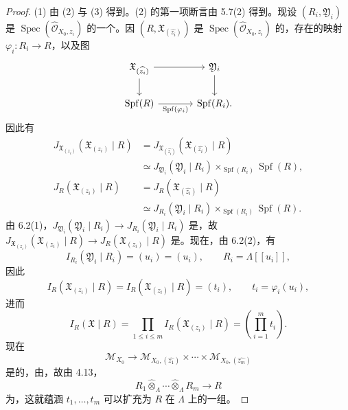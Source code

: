 \begin{proof}
(1) 由 (2) 与 (3) 得到。(2) 的第一项断言由 5.7(2) 得到。现设 $(R_i,\mathfrak Y_i)$ 是 $\operatorname{Spec}(\widehat{\mathcal O}_{X_0,z_i})$ 的一个。因 $(R,\mathfrak X_{(\widehat{z_i})})$ 是 $\operatorname{Spec}(\widehat{\mathcal O}_{X_0,z_i})$ 的，存在的映射 $\varphi_i:R_i\to R$，以及图
\[
\begin{tikzcd}[column sep=large]
\mathfrak X_{(\widehat{z_i})}\arrow[r]\arrow[d]&\mathfrak Y_i\arrow[d]\\
\operatorname{Spf}(R)\arrow[r,"\operatorname{Spf}(\varphi_i)"']&\operatorname{Spf}(R_i).
\end{tikzcd}
\]
因此有
\[
\begin{aligned}
J_{\mathfrak X_{(z_i)}}(\mathfrak X_{(z_i)}\mid R)
 &=J_{\mathfrak X_{(\widehat{z_i})}}(\mathfrak X_{(\widehat{z_i})}\mid R)\\
 &\simeq J_{\mathfrak Y_i}(\mathfrak Y_i\mid R_i)
 \times_{\operatorname{Spf}(R_i)}\operatorname{Spf}(R),\\
J_R(\mathfrak X_{(z_i)}\mid R)
 &=J_R(\mathfrak X_{(\widehat{z_i})}\mid R)\\
 &\simeq J_{R_i}(\mathfrak Y_i\mid R_i)
 \times_{\operatorname{Spf}(R_i)}\operatorname{Spf}(R).
\end{aligned}
\]
由 6.2(1)，$J_{\mathfrak Y_i}(\mathfrak Y_i\mid R_i)\to J_{R_i}(\mathfrak Y_i\mid R_i)$ 是，故
$J_{\mathfrak X_{(z_i)}}(\mathfrak X_{(z_i)}\mid R)\to J_R(\mathfrak X_{(z_i)}\mid R)$ 是。现在，由 6.2(2)，有
\[
I_{R_i}(\mathfrak Y_i\mid R_i)=(u_i)=(u_i),\qquad R_i=\Lambda[[u_i]],
\]
因此
\[
I_R(\mathfrak X_{(z_i)}\mid R)=I_R(\mathfrak X_{(\widehat{z_i})}\mid R)=(t_i),
\qquad t_i=\varphi_i(u_i),
\]
进而
\[
I_R(\mathfrak X\mid R)=\prod_{1\leq i\leq m}I_R(\mathfrak X_{(z_i)}\mid R)
 =\left(\prod_{i=1}^m t_i\right).
\]
现在
\[
\mathcal M_{X_0}\longrightarrow
\mathcal M_{X_0,(\widehat{z_1})}\times\cdots\times\mathcal M_{X_0,(\widehat{z_m})}
\]
是的，由，故由 4.13，
\[
R_1\widehat\otimes_\Lambda\cdots\widehat\otimes_\Lambda R_m\longrightarrow R
\]
为，这就蕴涵 $t_1,\ldots,t_m$ 可以扩充为 $R$ 在 $\Lambda$ 上的一组。


\end{proof}
